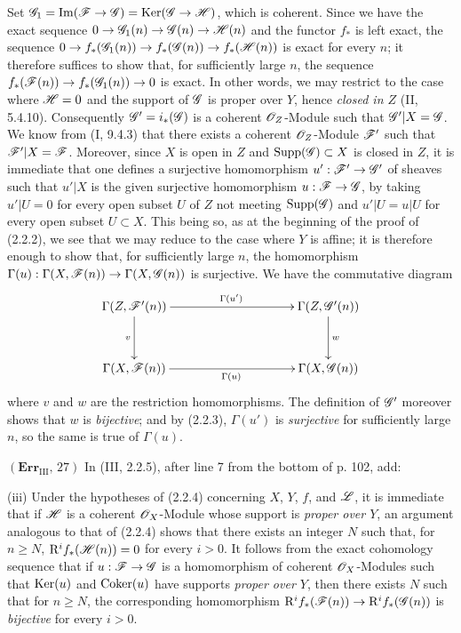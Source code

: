 Set
$\mathscr{G}_1=\operatorname{Im}(\mathscr{F}\to\mathscr{G})
=\operatorname{Ker}(\mathscr{G}\to\mathscr{H})$, which is coherent. Since we have the
exact sequence $0\to\mathscr{G}_1(n)\to\mathscr{G}(n)\to\mathscr{H}(n)$ and the functor
$f_*$ is left exact, the sequence
$0\to f_*(\mathscr{G}_1(n))\to f_*(\mathscr{G}(n))\to f_*(\mathscr{H}(n))$ is exact for every
$n$; it therefore suffices to show that, for sufficiently large $n$, the
sequence $f_*(\mathscr{F}(n))\to f_*(\mathscr{G}_1(n))\to0$ is exact. In other words, we
may restrict to the case where $\mathscr{H}=0$ and the support of $\mathscr{G}$ is
proper over $Y$, hence \emph{closed in $Z$} (II, 5.4.10). Consequently
$\mathscr{G}'=i_*(\mathscr{G})$ is a coherent $\mathscr{O}_Z$-Module such that
$\mathscr{G}'|X=\mathscr{G}$. We know from (I, 9.4.3) that there exists a coherent
$\mathscr{O}_Z$-Module $\mathscr{F}'$ such that $\mathscr{F}'|X=\mathscr{F}$. Moreover, since $X$
is open in $Z$ and $\operatorname{Supp}(\mathscr{G})\subset X$ is closed in $Z$, it
is immediate that one defines a surjective homomorphism
$u':\mathscr{F}'\to\mathscr{G}'$ of sheaves such that $u'|X$ is the given surjective
homomorphism $u:\mathscr{F}\to\mathscr{G}$, by taking $u'|U=0$ for every open subset $U$
of $Z$ not meeting $\operatorname{Supp}(\mathscr{G})$ and $u'|U=u|U$ for every open
subset $U\subset X$. This being so, as at the beginning of the proof of
(2.2.2), we see that we may reduce to the case where $Y$ is affine; it is
therefore enough to show that, for sufficiently large $n$, the homomorphism
$\Gamma(u):\Gamma(X,\mathscr{F}(n))\to\Gamma(X,\mathscr{G}(n))$ is surjective. We have
the commutative diagram
\[
\xymatrix@C=35mm@R=12mm{
\Gamma(Z,\sh{F}'(n)) \ar[r]^{\Gamma(u')} \ar[d]_v &
\Gamma(Z,\sh{G}'(n)) \ar[d]^w \\
\Gamma(X,\sh{F}(n)) \ar[r]_{\Gamma(u)} & \Gamma(X,\sh{G}(n))
}
\]
where $v$ and $w$ are the restriction homomorphisms. The definition of
$\mathscr{G}'$ moreover shows that $w$ is \emph{bijective}; and by (2.2.3),
$\Gamma(u')$ is \emph{surjective} for sufficiently large $n$, so the same is
true of $\Gamma(u)$.

\noindent\textbf{$(\mathbf{Err}_{\mathrm{III}},\,27)$} In (III, 2.2.5),
after line 7 from the bottom of p. 102, add:

(iii) Under the hypotheses of (2.2.4) concerning $X$, $Y$, $f$, and $\mathscr{L}$,
it is immediate that if $\mathscr{H}$ is a coherent $\mathscr{O}_X$-Module whose support
is \emph{proper over $Y$}, an argument analogous to that of (2.2.4) shows
that there exists an integer $N$ such that, for $n\geq N$,
$\mathrm{R}^if_*(\mathscr{H}(n))=0$ for every $i>0$. It follows from the exact
cohomology sequence that if $u:\mathscr{F}\to\mathscr{G}$ is a homomorphism of coherent
$\mathscr{O}_X$-Modules such that $\operatorname{Ker}(u)$ and $\operatorname{Coker}(u)$ have supports
\emph{proper over $Y$}, then there exists $N$ such that for $n\geq N$, the
corresponding homomorphism
$\mathrm{R}^if_*(\mathscr{F}(n))\to\mathrm{R}^if_*(\mathscr{G}(n))$ is \emph{bijective} for every
$i>0$.

